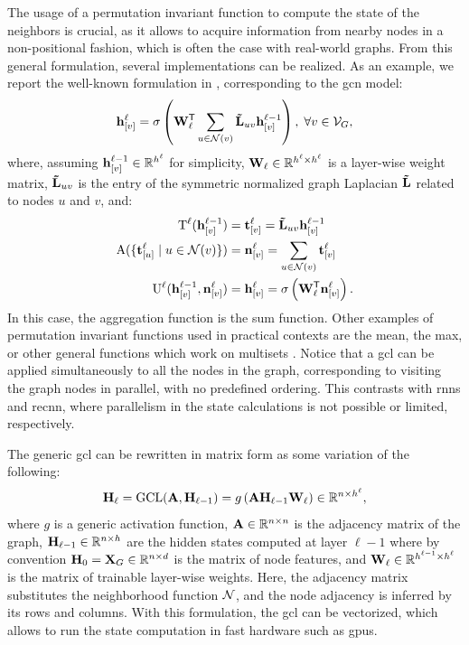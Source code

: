 The usage of a permutation invariant function to compute the state of the neighbors is crucial, as it allows to acquire information from nearby nodes in a non-positional fashion, which is often the case with real-world graphs. From this general formulation, several implementations can be realized. As an example, we report the well-known formulation in \cite{?}, corresponding to the \gls{gcn} model:
\begin{align}
\Elem{h}{v}^{\ell} = \sigma\Paren{\Matrix{W}^{\Transpose}_{\ell} \sum_{u \in \Cal{N}(v)} \Matrix{\tilde{L}}_{uv}\Elem{h}{v}^{\ell-1}}, \; \forall v \in \Cal{V}_G,
\label{eq:convolutional}
\end{align}
where, assuming $\Elem{h}{v}^{\ell-1} \in \Real^{h^{\ell}}$ for simplicity, $\Matrix{W}_{\ell} \in \Real^{h^{\ell} \times h^{\ell}}$ is a layer-wise weight matrix, $\Matrix{\tilde{L}}_{uv}$ is the entry of the symmetric normalized graph Laplacian $\Matrix{\tilde{L}}$ related to nodes $u$ and $v$, and:
\begin{align}
    \label{eq:transform}
    \Fun{T}^{\ell}(\Elem{h}{v}^{\ell-1}) &= \Elem{t}{v}^{\ell}  = \Matrix{\tilde{L}}_{uv}\Elem{h}{v}^{\ell-1}\\
    \label{eq:aggregate}
    \Fun{A}(\Set{\Elem{t}{u}^{\ell} \mid u \in \Cal{n}(v)}) &= \Elem{n}{v}^{\ell} = \sum_{u \in \Cal{n}(v)}\Elem{t}{v}^{\ell}\\
    \label{eq:update}
    \Fun{U}^{\ell}(\Elem{h}{v}^{\ell-1}, \Elem{n}{v}^{\ell}) &= \Elem{h}{v}^{\ell} =  \sigma\Paren{\Matrix{W}^{\Transpose}_{\ell} \Elem{n}{v}^{\ell}}.
\end{align}
In this case, the aggregation function is the sum function. Other examples of permutation invariant functions used in practical contexts are the mean, the max, or other general functions which work on multisets \cite{?}. Notice that a \gls{gcl} can be applied simultaneously to all the nodes in the graph, corresponding to visiting the graph nodes in parallel, with no predefined ordering. This contrasts with \glspl{rnn} and \gls{recnn}, where parallelism in the state calculations is not possible or limited, respectively.

The generic \gls{gcl} can be rewritten in matrix form as some variation of the following:
$$\Matrix{H}_{\ell} = \Fun{GCL}(\Matrix{A}, \Matrix{H}_{\ell-1}) = g\Paren{\Matrix{A}\Matrix{H}_{\ell-1}\Matrix{W}_{\ell}} \in \Real^{n \times h^{\ell}},$$
where $g$ is a generic activation function, $\Matrix{A} \in \Real^{n \times n}$ is the adjacency matrix of the graph, $\Matrix{H}_{\ell-1} \in \Real^{n \times h}$ are the hidden states computed at layer $\ell-1$ where by convention $\Matrix{H}_0 = \Matrix{X}_G \in \Real^{n \times d}$ is the matrix of node features, and $\Matrix{W}_{\ell} \in \Real^{h^{\ell-1} \times h^{\ell}}$ is the matrix of trainable layer-wise weights. Here, the adjacency matrix substitutes the neighborhood function $\Cal{N}$, and the node adjacency is inferred by its rows and columns. With this formulation, the \gls{gcl} can be vectorized, which allows to run the state computation in fast hardware such as \glspl{gpu}.

